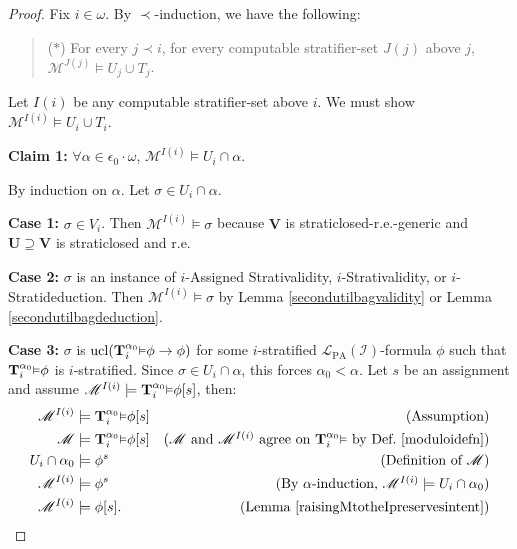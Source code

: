 \documentclass[reqno]{article}
\theoremstyle{definition}
\def\L{\mathscr{L}}
\def\M{\mathscr{M}}
\def\T{\mathbf{T}}
\def\U{\mathbf{U}}
\def\V{\mathbf{V}}
\def\LPA{\L_{\mathrm{PA}}}
\def\epom{\epsilon_0\cdot\omega}
\def\indset{\mathcal I}
\newcommand{\Prr}[2]{\T^{#1}_{#2}\mbox{\small${\vDash}$}}
\newcommand{\ucl}[1]{\mathrm{ucl}(#1)}
\newcommand{\case}[1]{\textbf{Case #1:}}
\newcommand{\claim}[1]{\textbf{Claim #1:}}
\begin{document}
\begin{proof}
Fix $i\in\omega$. By $\prec$-induction, we have the following:
\begin{quote}
($*$) For every $j\prec i$, for every computable stratifier-set $J(j)$ above
$j$, $\M^{J(j)}\models U_j\cup T_j$.
\end{quote}

Let $I(i)$ be any computable stratifier-set above $i$.
We must show $\M^{I(i)}\models U_i\cup T_i$.

\item
\claim1
$\forall \alpha\in\epom$, $\M^{I(i)}\models U_i\cap\alpha$.

\item
By induction on $\alpha$.
Let $\sigma\in U_i\cap\alpha$.

\item
\case1
$\sigma\in V_i$.
Then $\M^{I(i)}\models\sigma$ because
$\V$ is straticlosed-r.e.-generic and $\U\supseteq\V$
is straticlosed and r.e.

\item
\case2
$\sigma$ is an instance of $i$-Assigned Strativalidity, $i$-Strativalidity,
or $i$-Stratideduction.  Then $\M^{I(i)}\models\sigma$
by Lemma \ref{secondutilbagvalidity} or Lemma \ref{secondutilbagdeduction}.

\item
\case3
$\sigma$ is $\ucl{\Prr{\alpha_0} i\phi\rightarrow\phi}$ for some
$i$-stratified $\LPA(\indset)$-formula $\phi$ such that $\Prr{\alpha_0}i\phi$ is $i$-stratified.
Since $\sigma\in U_i\cap\alpha$, this forces $\alpha_0<\alpha$.
Let $s$ be an assignment and
assume $\M^{I(i)}\models\Prr{\alpha_0}i\phi[s]$, then:
\begin{align*}
\M^{I(i)} &\models \Prr{\alpha_0} i\phi[s]
  &\mbox{(Assumption)}\\
\M &\models \Prr{\alpha_0} i\phi[s]
  &\mbox{($\M$ and $\M^{I(i)}$ agree on $\Prr{\alpha_0} i$
  by Def.\ \ref{moduloidefn})}\\
U_i\cap \alpha_0 &\models \phi^s
  &\mbox{(Definition of $\M$)}\\
\M^{I(i)} &\models \phi^s
  &\mbox{(By $\alpha$-induction, $\M^{I(i)}\models U_i\cap \alpha_0$)}\\
\M^{I(i)} &\models \phi[s].
  &\mbox{(Lemma \ref{raisingMtotheIpreservesintent})}
\end{align*}



\end{proof}
\end{document}
